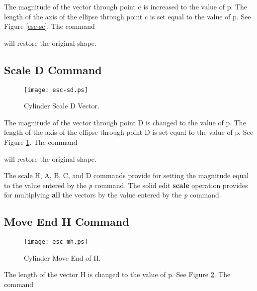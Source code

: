 The magnitude of the vector through point c is increased to the value of
p.  The length of the axis of the ellipse through point c is set equal to the
value of p.  See Figure \ref{esc-sc}.  The command


will restore the original shape.

\subsection{Scale D Command}

\begin{figure}
\centering \texttt{[image: esc-sd.ps]}
\caption{Cylinder Scale D Vector.}
\label{esc-sd}
\end{figure}


The magnitude of the vector through point D is changed to the value of p.
The length of the axis of the ellipse through point D is set equal to the
value of p.  See Figure \ref{esc-sd}.  The command


will restore the original shape.

The scale H, A, B, C, and D commands provide for setting the magnitude
equal to the value entered by the {\em p} command.
The solid edit {\bf scale} operation provides
for multiplying {\bf all} the vectors by the value
entered by the {\em p} command.

\subsection{Move End H Command}

\begin{figure}
\centering \texttt{[image: esc-mh.ps]}
\caption{Cylinder Move End of H.}
\label{esc-mh}
\end{figure}


The length of the vector H is changed to the value of p.
See Figure \ref{esc-mh}.  The command

